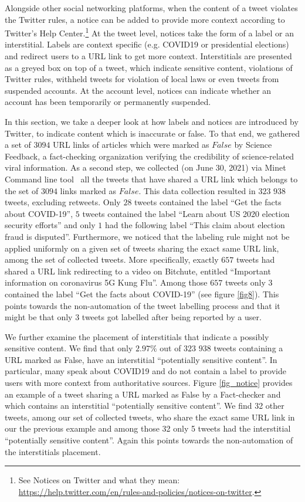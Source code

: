 \documentclass[11pt,a4paper]{article}
\begin{document}
Alongside other social networking platforms, when the content of a tweet violates the Twitter rules, a notice can be added to provide more context according to Twitter's Help Center.\footnote{See Notices on Twitter and what they mean: \href{https://help.twitter.com/en/rules-and-policies/notices-on-twitter}{https://help.twitter.com/en/rules-and-policies/notices-on-twitter}.} At the tweet level, notices take the form of a label or an interstitial. Labels are context specific (e.g. COVID19 or presidential elections) and  redirect users to a URL link to get more context. Interstitials are presented as a greyed box on top of a tweet, which indicate sensitive content, violations of Twitter rules, withheld tweets for violation of local laws or even tweets from suspended accounts. At the account level, notices can indicate whether an account has been temporarily or permanently suspended. 
\smallskip

In this section, we take a deeper look at how labels and notices are introduced by Twitter, to indicate content which is inaccurate or false. To that end, we gathered a set of $3094$ URL links of articles which were marked as $False$ by Science Feedback, a fact-checking organization verifying the credibility of science-related viral information. As a second step, we collected (on June 30, 2021) via Minet Command line tool~\cite{minet} all the tweets that have shared a URL link which belongs to the set of $3094$ links marked as $False$. This data collection resulted in $323$ $938$ tweets, excluding retweets. Only $28$ tweets contained the label { ``Get the facts about COVID-19''}, $5$ tweets contained the label { ``Learn about US 2020 election security efforts''} and only $1$ had the following label {``This claim about election fraud is disputed''}. Furthermore, we noticed that the labeling rule might not be applied uniformly on a given set of tweets sharing the exact same URL link, among the set of collected tweets. More specifically, exactly $657$ tweets had shared a URL link redirecting to a video on Bitchute, entitled ``Important information on coronavirus 5G Kung Flu''. Among those $657$ tweets only $3$ contained the label ``Get the facts about COVID-19'' (see figure \ref{fig8}). This points towards the non-automation of the tweet labelling process and that it might be that only $3$ tweets got labelled after being reported by a user. 

We further examine the placement of interstitials that indicate a possibly sensitive content. We find that only $2.97\%$ out of $323$ $938$ tweets containing a URL marked as False, have an interstitial ``potentially sensitive content''. In particular, many speak about COVID19 and do not contain a label to provide users with more context from authoritative sources. Figure \ref{fig_notice} provides an example of a tweet sharing a URL marked as False by a Fact-checker and which contains an interstitial ``potentially sensitive content''. We find 32 other tweets, among our set of collected tweets, who share the exact same URL link in our the previous example and among those 32 only 5 tweets had the interstitial ``potentially sensitive content''. Again this points towards the non-automation of the interstitials placement. 
\end{document}
